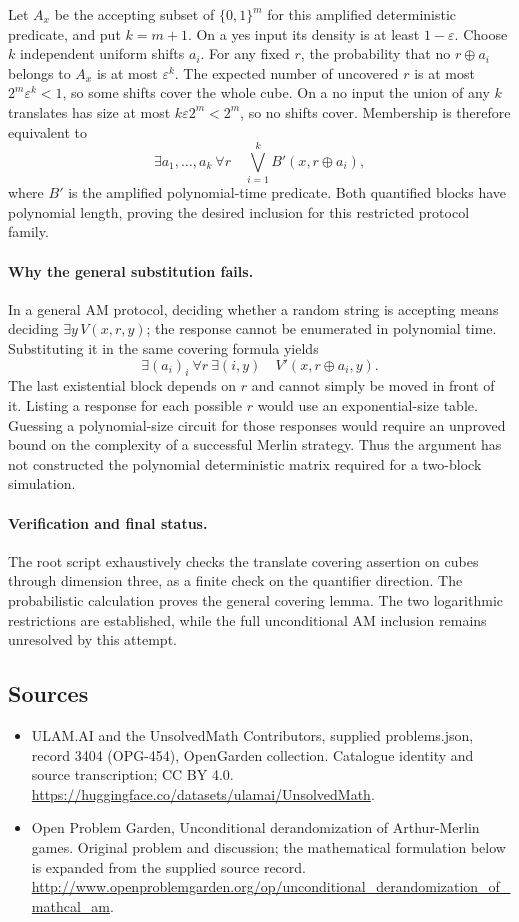 \documentclass[11pt,a4paper]{article}
\begin{document}
Let $A_x$ be the accepting subset of $\{0,1\}^m$
for this amplified deterministic predicate, and
put $k=m+1$. On a yes input its density is at
least $1-\varepsilon$. Choose $k$ independent
uniform shifts $a_i$. For any fixed $r$, the
probability that no $r\mathbin\oplus a_i$
belongs to $A_x$ is at most $\varepsilon^k$.
The expected number of uncovered $r$ is at most
$2^m\varepsilon^k<1$, so some shifts cover the
whole cube. On a no input the union of any $k$
translates has size at most $k\varepsilon2^m<2^m$,
so no shifts cover. Membership is therefore
equivalent to
\[
 \exists a_1,\ldots,a_k\ \forall r\quad
             \bigvee_{i=1}^k B'(x,r\mathbin\oplus a_i),
\]
where $B'$ is the amplified polynomial-time
predicate. Both quantified blocks have polynomial
length, proving the desired inclusion for this
restricted protocol family.

\paragraph{Why the general substitution fails.}
In a general AM protocol, deciding whether a
random string is accepting means deciding
$\exists y\,V(x,r,y)$; the response cannot be
enumerated in polynomial time. Substituting it
in the same covering formula yields
\[
 \exists(a_i)_i\ \forall r\ \exists(i,y)\quad
                   V'(x,r\mathbin\oplus a_i,y).
\]
The last existential block depends on $r$ and
cannot simply be moved in front of it. Listing
a response for each possible $r$ would use an
exponential-size table. Guessing a polynomial-size
circuit for those responses would require an
unproved bound on the complexity of a successful
Merlin strategy. Thus the argument has not
constructed the polynomial deterministic matrix
required for a two-block simulation.

\paragraph{Verification and final status.}
The root script exhaustively checks the translate
covering assertion on cubes through dimension
three, as a finite check on the quantifier
direction. The probabilistic calculation proves
the general covering lemma. The two logarithmic
restrictions are established, while the full
unconditional AM inclusion remains unresolved
by this attempt.

\subsection{Sources}
\begin{itemize}
\item[S1] ULAM.AI and the UnsolvedMath Contributors, supplied problems.json, record 3404 (OPG-454), OpenGarden collection. Catalogue identity and source transcription; CC BY 4.0.
\url{https://huggingface.co/datasets/ulamai/UnsolvedMath}.
\item[S2] Open Problem Garden, Unconditional derandomization of Arthur-Merlin games. Original problem and discussion; the mathematical formulation below is expanded from the supplied source record.
\url{http://www.openproblemgarden.org/op/unconditional_derandomization_of_mathcal_am}.

\end{itemize}
\end{document}
